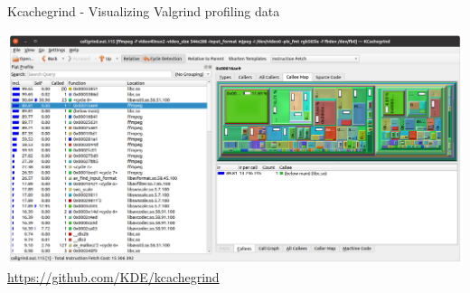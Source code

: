 \begin{frame}{Kcachegrind - Visualizing Valgrind profiling data}
  \begin{center}
    \includegraphics[height=0.8\textheight]{common/kcachegrind.png}
    \url{https://github.com/KDE/kcachegrind}
  \end{center}
\end{frame}
